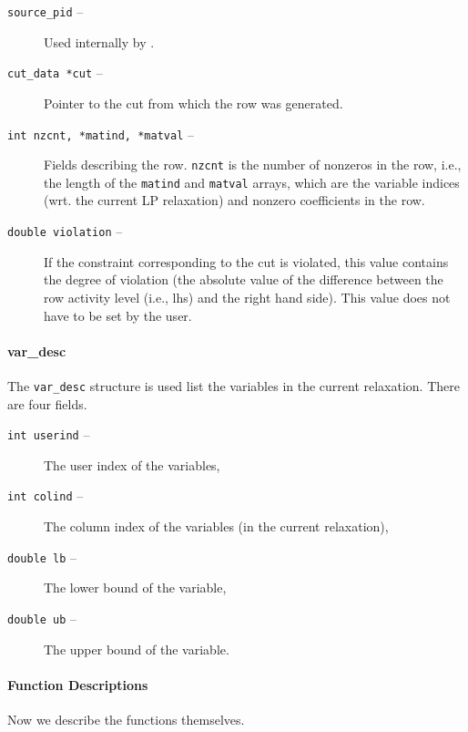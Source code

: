 \begin{description}
\begin{description}

\item[{\tt source\_pid} --] Used internally by \BB.

\item[{\tt cut\_data *cut} --] Pointer to the cut from which the row was generated.

\item[{\tt int nzcnt, *matind, *matval} --] Fields describing the row. {\tt nzcnt} is the number of nonzeros in
the row, i.e., the length of the {\tt matind} and {\tt matval} arrays,
which are the variable indices (wrt. the current LP relaxation) and
nonzero coefficients in the row.

\item[{\tt double violation} --] If the constraint corresponding to the cut is violated, this value
contains the degree of violation (the absolute value of the difference
between the row activity level (i.e., lhs) and the right hand
side). This value does not have to be set by the user.

\end{description}

\begin{htmlonly}
\paragraph{var\_desc}
\end{htmlonly}
\begin{latexonly}
\end{latexonly}

The {\tt var\_desc} structure is used list the variables in the current
relaxation. There are four fields.

\begin{description}
\item[{\tt int userind} --] The user index of the variables,
\item[{\tt int colind} --] The column index of the variables (in the
current relaxation),
\item[{\tt double lb} --] The lower bound of the variable,
\item[{\tt double ub} --] The upper bound of the variable.
\end{description}

\end{description}

\begin{latexonly}
\newpage
\paragraph{Function Descriptions}
\noindent Now we describe the functions themselves.
\end{latexonly}

